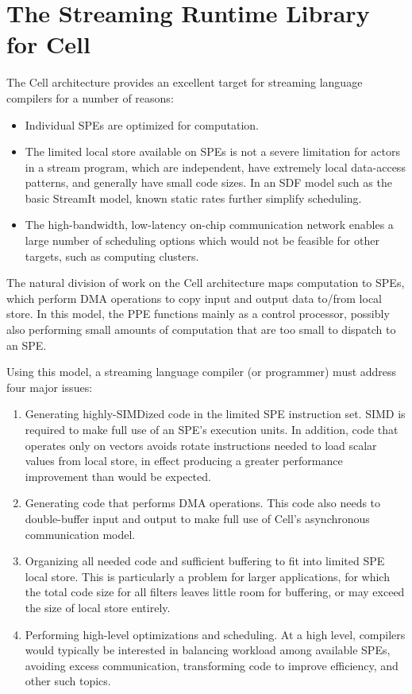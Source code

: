 \section{The Streaming Runtime Library for Cell}\label{ch:lib}

The Cell architecture provides an excellent target for streaming language compilers for a number of reasons:
\begin{itemize}
\item Individual SPEs are optimized for computation.
\item The limited local store available on SPEs is not a severe limitation for actors in a stream program, which are independent, have extremely local data-access patterns, and generally have small code sizes. In an SDF model such as the basic StreamIt model, known static rates further simplify scheduling.
\item The high-bandwidth, low-latency on-chip communication network enables a large number of scheduling options which would not be feasible for other targets, such as computing clusters.
\end{itemize}

The natural division of work on the Cell architecture maps computation to SPEs, which perform DMA operations to copy input and output data to/from local store. In this model, the PPE functions mainly as a control processor, possibly also performing small amounts of computation that are too small to dispatch to an SPE.

Using this model, a streaming language compiler (or programmer) must address four major issues:
\begin{enumerate}
\item Generating highly-SIMDized code in the limited SPE instruction set. SIMD is required to make full use of an SPE's execution units. In addition, code that operates only on vectors avoids rotate instructions needed to load scalar values from local store, in effect producing a greater performance improvement than would be expected.
\item Generating code that performs DMA operations. This code also needs to double-buffer input and output to make full use of Cell's asynchronous communication model.
\item Organizing all needed code and sufficient buffering to fit into limited SPE local store. This is particularly a problem for larger applications, for which the total code size for all filters leaves little room for buffering, or may exceed the size of local store entirely.
\item Performing high-level optimizations and scheduling. At a high level, compilers would typically be interested in balancing workload among available SPEs, avoiding excess communication, transforming code to improve efficiency, and other such topics.
\end{enumerate}

